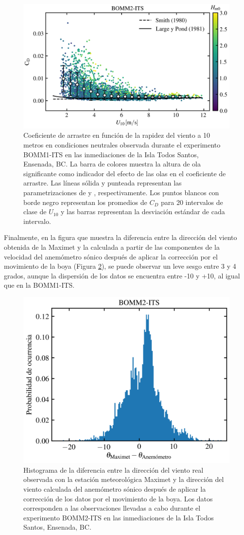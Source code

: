 \documentclass[11pt]{article}
\begin{document}
\begin{figure}[htpb]
  \centering
  \includegraphics[width=0.68\linewidth]{../figures/bomm2_its_drag_coefficient.png}
  \caption{
    Coeficiente de arrastre en función de la rapidez del viento a 10 metros en
    condiciones neutrales observada durante el experimento BOMM1-ITS en las
    inmediaciones de la Isla Todos Santos, Ensenada, BC.  La barra de colores
    muestra la altura de ola significante como indicador del efecto de las olas
    en el coeficiente de arrastre. Las líneas sólida y punteada representan las
    parametrizaciones de \citet{Smith1980} y \citet{LargePond1981},
    respectivamente. Los puntos blancos con borde negro representan los
    promedios de $C_D$ para 20 intervalos de clase de $U_{10}$ y las barras
    representan la desviación estándar de cada intervalo.
  }
  \label{fig:bomm2_its_drag_coefficient}
\end{figure}

Finalmente, en la figura que muestra la diferencia entre la dirección del viento
obtenida de la Maximet y la calculada a partir de las componentes de la
velocidad del anemómetro sónico después de aplicar la corrección por el
movimiento de la boya (Figura \ref{fig:bomm2_its_wind_direction_histogram}), se
puede observar un leve sesgo entre 3 y 4 grados, aunque la dispersión de los
datos se encuentra entre -10 y +10, al igual que en la BOMM1-ITS.

\begin{figure}[htpb]
  \centering
  \includegraphics[width=0.5\linewidth]{../figures/bomm2_its_wind_direction_histogram.png}
  \caption{
    Histograma de la diferencia entre la dirección del viento real observada con
    la estación meteorológica Maximet y la dirección del viento calculada del
    anemómetro sónico después de aplicar la corrección de los datos por el
    movimiento de la boya. Los datos corresponden a las observaciones llevadas a
    cabo durante el experimento BOMM2-ITS en las inmediaciones de la Isla Todos
    Santos, Ensenada, BC.
  }
  \label{fig:bomm2_its_wind_direction_histogram}
\end{figure}
\end{document}
